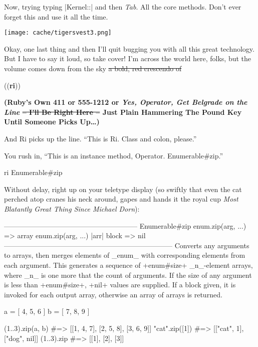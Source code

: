 \documentclass[12pt,twoside]{report}
\begin{document}
Now, trying typing \consoleinline|Kernel::| and then
\emph{Tab}. All the core methods. Don't ever forget this and use it
all the time.

\texttt{[image: cache/tigersvest3.png]} 

Okay, one last thing and then I'll quit bugging you with all this
great technology. But I have to say it loud, so take cover! I'm across
the world here, folks, but the volume comes down from the sky \sout{a
bold, red crescendo of}

\begin{center}
{\Huge{\color{parensaroundricolor}((}\color{ricolor}\textbf{ri}{\color{parensaroundricolor}))}}
\end{center}

{\color{belgradeoperatorcolor}
\bf\large (Ruby's Own 411 or 555-1212 or \emph{Yes, Operator, Get
    Belgrade on the Line} \sout{-- I'll Be Right Here --} Just Plain
  Hammering The Pound Key Until Someone Picks Up\ldots)}

And Ri picks up the line.  ``This is Ri. Class and colon, please.''  

You rush in, ``This is an instance method, Operator. Enumerable\#zip.''

\begin{consolecode}
 ri Enumerable#zip
\end{consolecode}

Without delay, right up on your teletype display (so swiftly that even
the cat perched atop cranes his neck around, gapes and hands it the
royal cup \emph{Most Blatantly Great Thing Since Michael Dorn}):

\begin{consolecode}
 --------------------------------------------------------- Enumerable#zip
      enum.zip(arg, ...)                   => array
      enum.zip(arg, ...) {|arr| block }    => nil
 ------------------------------------------------------------------------
      Converts any arguments to arrays, then merges elements of _enum_
      with corresponding elements from each argument. This generates a
      sequence of +enum#size+ _n_-element arrays, where _n_ is one more
      that the count of arguments. If the size of any argument is less
      than +enum#size+, +nil+ values are supplied. If a block given, it
      is invoked for each output array, otherwise an array of arrays is
      returned.

         a = [ 4, 5, 6 ]
         b = [ 7, 8, 9 ]

         (1..3).zip(a, b)      #=> [[1, 4, 7], [2, 5, 8], [3, 6, 9]]
         "cat\ndog".zip([1])   #=> [["cat\n", 1], ["dog", nil]]
         (1..3).zip            #=> [[1], [2], [3]]
\end{consolecode}
\end{document}
